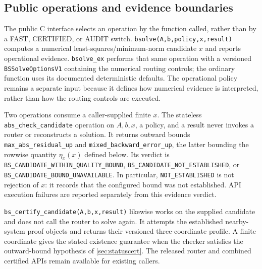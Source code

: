 \documentclass[11pt]{article}
\theoremstyle{definition}
\begin{document}
\subsection{Public operations and evidence boundaries}
The public C interface selects an operation by the function called, rather than
by a FAST, CERTIFIED, or AUDIT switch.  \texttt{bsolve(A,b,policy,x,result)}
computes a numerical least-squares/minimum-norm candidate \(x\) and reports
operational evidence.  \texttt{bsolve\_ex} performs that same operation with a
versioned \texttt{BSSolveOptionsV1} containing the numerical routing controls;
the ordinary function uses its documented deterministic defaults.  The
operational policy remains a separate input because it defines how numerical
evidence is interpreted, rather than how the routing controls are executed.

Two operations consume a caller-supplied finite \(x\).  The stateless
\texttt{abs\_check\_candidate} operation on \(A,b,x\), a policy, and a result
never invokes a router or reconstructs a solution.  It returns outward bounds
\texttt{max\_abs\_residual\_up} and
\texttt{mixed\_backward\_error\_up}, the latter bounding the rowwise quantity
\(\eta_x(x)\) defined below.  Its verdict is
\texttt{BS\_CANDIDATE\_}\allowbreak\texttt{WITHIN\_QUALITY\_BOUND},
\texttt{BS\_CANDIDATE\_}\allowbreak\texttt{NOT\_ESTABLISHED}, or
\texttt{BS\_CANDIDATE\_}\allowbreak\texttt{BOUND\_UNAVAILABLE}.  In
particular, \texttt{NOT\_ESTABLISHED} is not rejection of \(x\): it records
that the configured bound was not established.  API execution failures are
reported separately from this evidence verdict.

\texttt{bs\_certify\_candidate(A,b,x,result)} likewise works on the supplied
candidate and does not call the router to solve again.  It attempts the
established nearby-system proof objects and returns their versioned
three-coordinate profile.  A finite coordinate gives the stated existence guarantee when the checker satisfies the outward-bound hypothesis of \cref{sec:statuscert}.  The released router and combined
certified APIs remain available for existing callers.
\end{document}
